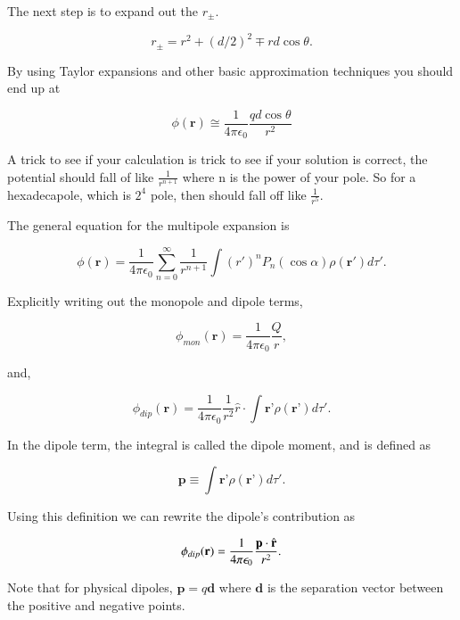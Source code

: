 \documentclass[preprint, review,12pt]{elsarticle}
\def\k{\frac{1}{4 \pi \epsilon_0}}
\def\.{\cdot}
\def\b{\textbf}
\def\={\equiv}
\newcommand{\hb}[1]{\hat{\b #1}}
\begin{document}
The next step is to expand out the $r_\pm$.

\begin{equation}
    r_\pm = r^2 + (d/2)^2 \mp rd\cos\theta.
\end{equation}

By using Taylor expansions and other basic approximation techniques you should end up at

\begin{equation}
    \phi(\b{r}) \cong \k \frac{qd\cos\theta}{r^2}
\end{equation}

A trick to see if your calculation is trick to see if your solution is correct, the potential should fall of like $\frac{1}{r^{n+1}}$ where n is the power of your pole. So for a hexadecapole, which is $2^4$ pole, then should fall off like $\frac{1}{r^5}$.

The general equation for the multipole expansion is

\begin{equation}
    \phi(\b{r}) = \frac{1}{4\pi \epsilon_0} \sum_{n=0}^\infty \frac{1}{r^{n+1}} \int (r')^n P_n(\cos \alpha ) \rho(\b{r}')d\tau'.
\end{equation}


Explicitly writing out the monopole and dipole terms,

\begin{equation}
    \phi_{mon}(\b{r}) = \k \frac{Q}{r},
\end{equation}

and,

\begin{equation}
    \phi_{dip}(\b{r}) = \frac{1}{4 \pi \epsilon_0}\frac{1}{r^2}\hat{r}\. \int \b{r'}\rho(\b{r'})d\tau'.
\end{equation}

In the dipole term, the integral is called the dipole moment, and is defined as

\begin{equation}
    \b{p} \= \int\b{r'} \rho(\b{r'})d\tau'.
\end{equation}

Using this definition we can rewrite the dipole's contribution as

\begin{equation}
    \phi_{dip}(\b{r}) = \k\frac{\b{p}\. \hb{r}}{r^2}.
\end{equation}

Note that for physical dipoles, $\b{p} = q\b{d}$ where $\b{d}$ is the separation vector between the positive and negative points.
\end{document}
